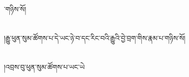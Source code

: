 ་གཉིས་སོ།\chapter{ }།རྒྱུ་ཕུན་སུམ་ཚོགས་པ་དེ་ཡང་ཉེ་བ་དང་རིང་བའི་རྒྱུའི་བྱེ་བྲག་གིས་རྣམ་པ་གཉིས་སོ།\chapter{ }།འབྲས་བུ་ཕུན་སུམ་ཚོགས་པ་ཡང་ཡེ